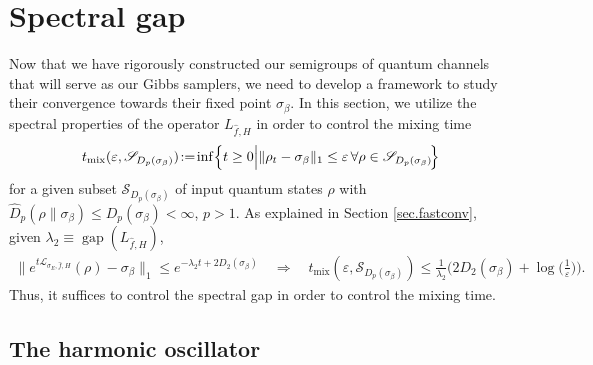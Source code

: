 \documentclass[11pt]{amsart}
\newcommand{\1}{\mathbbm{1}}
\renewcommand{\epsilon}{\varepsilon}
\theoremstyle{plain}
\theoremstyle{definition}
\theoremstyle{remark}
\numberwithin{equation}{section}
\begin{document}
\section{Spectral gap}\label{sec:spectralgaps}

Now that we have rigorously constructed our semigroups of quantum channels that will serve as our Gibbs samplers, we need to develop a framework to study their convergence towards their fixed point $\sigma_\beta$. In this section, we utilize the spectral properties of the operator $L_{\widehat{f},H}$ in order to control the mixing time
\[
t_{\operatorname{mix}}(\epsilon,\mathscr{S}_{D_p(\sigma_\beta)})
\!:=\!\inf\Bigl\{ t \ge 0 \Big| \| \rho_t - \sigma_\beta \|_1 \le \epsilon \,\forall\rho \in \mathscr{S}_{D_p(\sigma_\beta)}\! \Bigr\}
\]
for a given subset $\mathscr{S}_{D_p(\sigma_{\beta})}$ of input quantum states $\rho$ with $\widehat{D}_p(\rho\|\sigma_\beta)\le D_p(\sigma_\beta)<\infty$, $p>1$. As explained in Section \ref{sec.fastconv}, given $\lambda_2\equiv \operatorname{gap}(L_{\widehat{f},H})$, 
\begin{align*}
\big\|e^{t\mathcal{L}_{\sigma_E,\widehat{f},H}}(\rho)-\sigma_{\beta}\big\|_1\le e^{-\lambda_2 t+2{D}_2(\sigma_\beta)}
\quad \Longrightarrow \quad t_{\operatorname{mix}}(\epsilon,\mathscr{S}_{D_p(\sigma_\beta)})\le  \frac{1}{\lambda_2}\Big(2D_2(\sigma_\beta)+\log\Big(\frac{1}{\epsilon}\Big)\Big).
\end{align*}
Thus, it suffices to control the spectral gap in order to control the mixing time. 

\subsection{The harmonic oscillator}\label{sec:gaussexamples}
\end{document}
